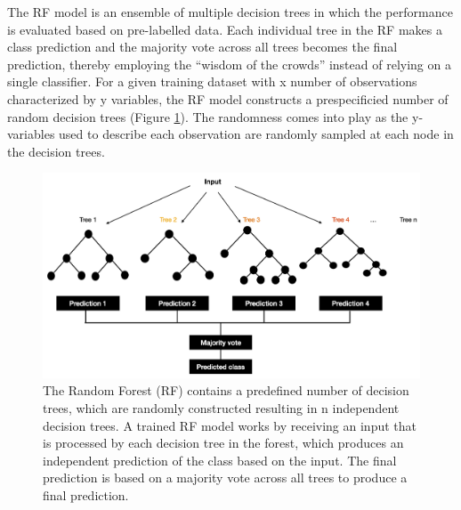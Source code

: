 The RF model is an ensemble of multiple decision trees in which the performance is evaluated based on pre-labelled data. Each individual tree in the RF makes a class prediction and the majority vote across all trees becomes the final prediction, thereby employing the “wisdom of the crowds” instead of relying on a single classifier. For a given training dataset with x number of observations characterized by y variables, the RF model constructs a prespecificied number of random decision trees (Figure \ref{fig:RF}). The randomness comes into play as the y-variables used to describe each observation are randomly sampled at each node in the decision trees.

\begin{figure}[H]
  \begin{center}
    \includegraphics[scale=1, width=1\textwidth]{pictures/Random_forest.png}
  \end{center}
  \caption[VirusTimeline]{The Random Forest (RF) contains a predefined number of decision trees, which are randomly constructed resulting in n independent decision trees. A trained RF model works by receiving an input that is processed by each decision tree in the forest, which produces an independent prediction of the class based on the input. The final prediction is based on a majority vote across all trees to produce a final prediction.
  }
  \label{fig:RF}
\end{figure}

